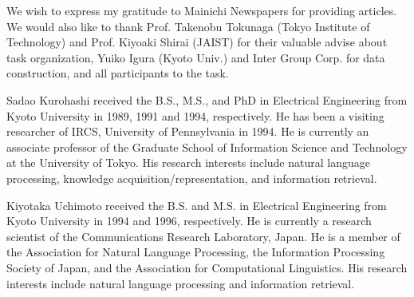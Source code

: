 \begin{flushleft}
 \acknowledgment
\end{flushleft}

We wish to express my gratitude to Mainichi Newspapers for providing
articles.  We would also like to thank Prof. Takenobu Tokunaga (Tokyo
Institute of Technology) and Prof. Kiyoaki Shirai (JAIST) for their
valuable advise about task organization, Yuiko Igura (Kyoto Univ.) and
Inter Group Corp. for data construction, and all participants to the
task.




\begin{biography}
\biotitle{}

{Sadao Kurohashi received the B.S., M.S., and PhD in Electrical
Engineering from Kyoto University in 1989, 1991 and 1994,
respectively.  He has been a visiting researcher of IRCS, University
of Pennsylvania in 1994.  He is currently an associate professor of
the Graduate School of Information Science and Technology at the
University of Tokyo. His research interests include natural language
processing, knowledge acquisition/representation, and information
retrieval.}

{Kiyotaka Uchimoto received the B.S. and M.S. in Electrical Engineering
from Kyoto University in 1994 and 1996, respectively. He is currently
a research scientist of the Communications Research Laboratory, Japan. 
He is a member of the Association for Natural Language Processing, the
Information Processing Society of Japan, and the Association for
Computational Linguistics. His research interests include natural
language processing and information retrieval.}


\end{biography}


